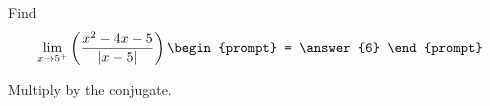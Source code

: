 \documentclass{ximera}
\author{Matthew Carr}
\begin{document}
\begin{exercise}



Find
\[
\lim_{x\to5^{+}}\left(\frac{x^2-4x-5}{\left|x-5\right|}\right)
\begin{prompt}
= \answer{6}
\end{prompt}
\]

\begin{hint}
Multiply by the conjugate.
\end{hint}
\end{exercise}
\end{document}

